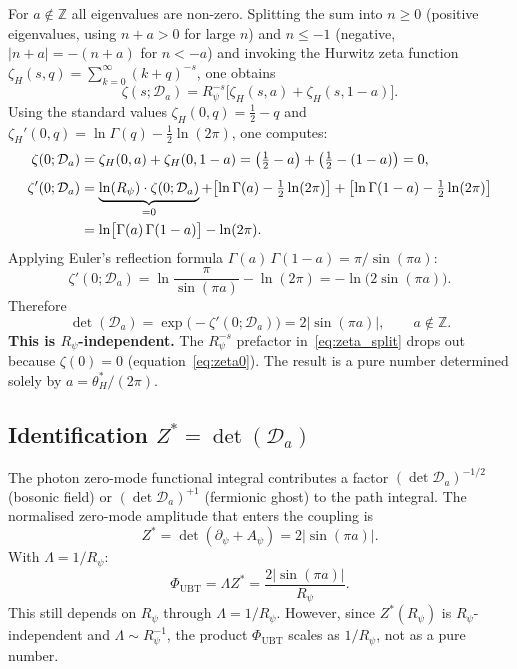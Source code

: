 \documentclass[11pt,a4paper]{article}
\theoremstyle{definition}
\theoremstyle{remark}
\begin{document}
For $a\notin\mathbb{Z}$ all eigenvalues are non-zero.
Splitting the sum into $n\geq 0$ (positive eigenvalues, using $n+a > 0$ for
large $n$) and $n\leq -1$ (negative, $\lvert n+a\rvert = -(n+a)$ for
$n < -a$) and invoking the Hurwitz zeta function
$\zeta_H(s,q)=\sum_{k=0}^\infty(k+q)^{-s}$, one obtains
\begin{equation}
  \zeta(s;\mathcal{D}_a)
  = R_\psi^{-s}\bigl[\zeta_H(s,a) + \zeta_H(s,1-a)\bigr].
  \label{eq:zeta_split}
\end{equation}
Using the standard values
$\zeta_H(0,q) = \tfrac{1}{2}-q$ and
$\zeta_H'(0,q) = \ln\Gamma(q) - \tfrac{1}{2}\ln(2\pi)$,
one computes:
\begin{align}
  \zeta(0;\mathcal{D}_a)
  &= \zeta_H(0,a)+\zeta_H(0,1-a)
   = \bigl(\tfrac{1}{2}-a\bigr)+\bigl(\tfrac{1}{2}-(1-a)\bigr) = 0,
  \label{eq:zeta0}\\[4pt]
  \zeta'(0;\mathcal{D}_a)
  &= \underbrace{\ln(R_\psi)\cdot\zeta(0;\mathcal{D}_a)}_{=0}
     + \bigl[\ln\Gamma(a)-\tfrac{1}{2}\ln(2\pi)\bigr]
     + \bigl[\ln\Gamma(1-a)-\tfrac{1}{2}\ln(2\pi)\bigr] \notag\\
  &= \ln\bigl[\Gamma(a)\,\Gamma(1-a)\bigr] - \ln(2\pi).
  \label{eq:zetaprime0}
\end{align}
Applying Euler's reflection formula $\Gamma(a)\,\Gamma(1-a) = \pi/\sin(\pi a)$:
\begin{equation}
  \zeta'(0;\mathcal{D}_a)
  = \ln\!\frac{\pi}{\sin(\pi a)} - \ln(2\pi)
  = -\ln\!\bigl(2\sin(\pi a)\bigr).
  \label{eq:zetaprime_final}
\end{equation}
Therefore
\begin{equation}
  \boxed{
  \det(\mathcal{D}_a)
  = \exp\bigl(-\zeta'(0;\mathcal{D}_a)\bigr)
  = 2\lvert\sin(\pi a)\rvert,
  \qquad a\notin\mathbb{Z}.
  }
  \label{eq:det_main}
\end{equation}
\textbf{This is $R_\psi$-independent.}
The $R_\psi^{-s}$ prefactor in~\eqref{eq:zeta_split} drops out because
$\zeta(0)=0$ (equation~\eqref{eq:zeta0}).
The result is a pure number determined solely by $a = \theta_H^*/(2\pi)$.

\subsection{Identification $Z^* = \det(\mathcal{D}_a)$}

The photon zero-mode functional integral contributes a factor
$(\det \mathcal{D}_a)^{-1/2}$ (bosonic field) or
$(\det \mathcal{D}_a)^{+1}$ (fermionic ghost) to the path integral.
The normalised zero-mode amplitude that enters the coupling is
\begin{equation}
  Z^* = \det(\partial_\psi + A_\psi) = 2\lvert\sin(\pi a)\rvert.
  \label{eq:Z_star_zetadet}
\end{equation}
With $\Lambda = 1/R_\psi$:
\begin{equation}
  \Phi_{\mathrm{UBT}}
  = \Lambda Z^*
  = \frac{2\lvert\sin(\pi a)\rvert}{R_\psi}.
  \label{eq:phi_L3_Rpsi}
\end{equation}
This still depends on $R_\psi$ through $\Lambda = 1/R_\psi$.
However, since $Z^*(R_\psi)$ is $R_\psi$-independent and $\Lambda \sim R_\psi^{-1}$,
the product $\Phi_{\mathrm{UBT}}$ scales as $1/R_\psi$, not as a pure number.
\end{document}
